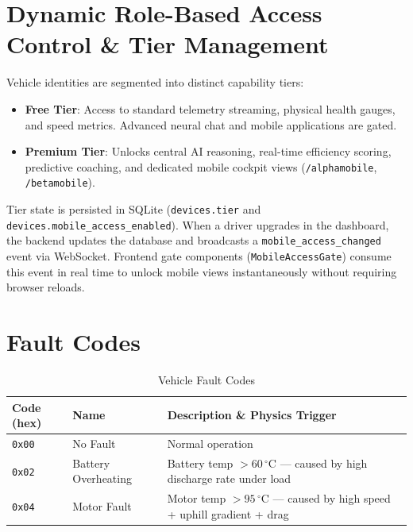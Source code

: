 \documentclass[12pt,a4paper]{report}
\begin{document}
\section{Dynamic Role-Based Access Control \& Tier Management}

Vehicle identities are segmented into distinct capability tiers:
\begin{itemize}
  \item \textbf{Free Tier}: Access to standard telemetry streaming, physical health gauges, and speed metrics. Advanced neural chat and mobile applications are gated.
  \item \textbf{Premium Tier}: Unlocks central AI reasoning, real-time efficiency scoring, predictive coaching, and dedicated mobile cockpit views (\texttt{/alphamobile}, \texttt{/betamobile}).
\end{itemize}

Tier state is persisted in SQLite (\nolinkurl{devices.tier} and \nolinkurl{devices.mobile_access_enabled}). When a driver upgrades in the dashboard, the backend updates the database and broadcasts a \texttt{mobile\_access\_changed} event via WebSocket. Frontend gate components (\texttt{MobileAccessGate}) consume this event in real time to unlock mobile views instantaneously without requiring browser reloads.

\section{Fault Codes}

\begin{table}[H]
\centering
\caption{Vehicle Fault Codes}
\label{tab:faults}
\begin{tabularx}{\textwidth}{C{2cm} L{3.5cm} X}
\toprule
\textbf{Code (hex)} & \textbf{Name} & \textbf{Description \& Physics Trigger} \\
\midrule
\texttt{0x00} & No Fault & Normal operation \\
\texttt{0x02} & Battery Overheating & Battery temp $> 60\,^\circ\mathrm{C}$ --- caused by high discharge rate under load \\
\texttt{0x04} & Motor Fault & Motor temp $> 95\,^\circ\mathrm{C}$ --- caused by high speed + uphill gradient + drag \\
\bottomrule
\end{tabularx}
\end{table}

\end{document}
